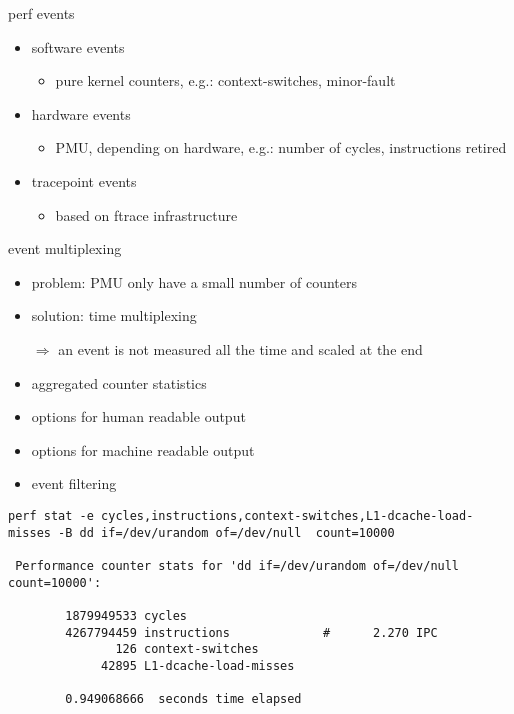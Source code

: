 \begin{frame}{perf events}
\begin{itemize}
  \item software events
  \begin{itemize}
    \item pure kernel counters, e.g.: context-switches, minor-fault
  \end{itemize}
  \item hardware events
  \begin{itemize}
    \item PMU, depending on hardware, e.g.: number of cycles, instructions retired
  \end{itemize}
  \item tracepoint events
  \begin{itemize}
    \item based on ftrace infrastructure
  \end{itemize}
\end{itemize}
\end{frame}

\begin{frame}{event multiplexing}
\begin{itemize}
  \item problem: PMU only have a small number of counters
  \item solution: time multiplexing
  \item[$\Rightarrow$] an event is not measured all the time and scaled at the end
\end{itemize}
\end{frame}

\begin{frame}[fragile]{}
\begin{itemize}
  \item aggregated counter statistics
  \item options for human readable output
  \item options for machine readable output
  \item event filtering
\end{itemize}
\begin{lstlisting}[basicstyle=\tiny\ttfamily]
perf stat -e cycles,instructions,context-switches,L1-dcache-load-misses -B dd if=/dev/urandom of=/dev/null  count=10000

 Performance counter stats for 'dd if=/dev/urandom of=/dev/null count=10000':

        1879949533 cycles                  
        4267794459 instructions             #      2.270 IPC  
               126 context-switches        
             42895 L1-dcache-load-misses   

        0.949068666  seconds time elapsed
\end{lstlisting}
\end{frame}


